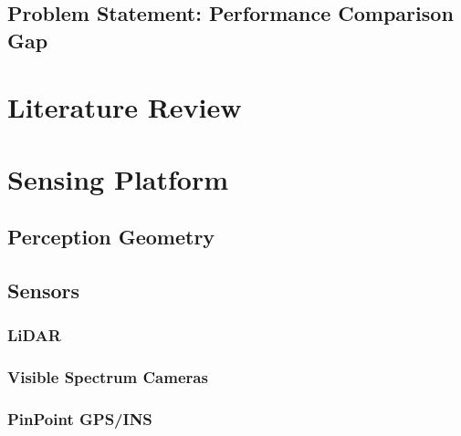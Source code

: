 \documentclass{erauthesis}
\begin{document}
\section{Problem Statement: Performance Comparison Gap} \label{problem_statement1}


\chapter{Literature Review} \label{litReview}
% 


\chapter{Sensing Platform} \label{sensing_platform}


\section{Perception Geometry} \label{perception_geometry}


\section{Sensors} \label{sensors}
% 

\subsection{LiDAR} \label{sensors_LiDAR}


\subsection{Visible Spectrum Cameras} \label{visual_cameras}


\subsection{PinPoint GPS/INS} \label{sensors_GPS}

\end{document}
